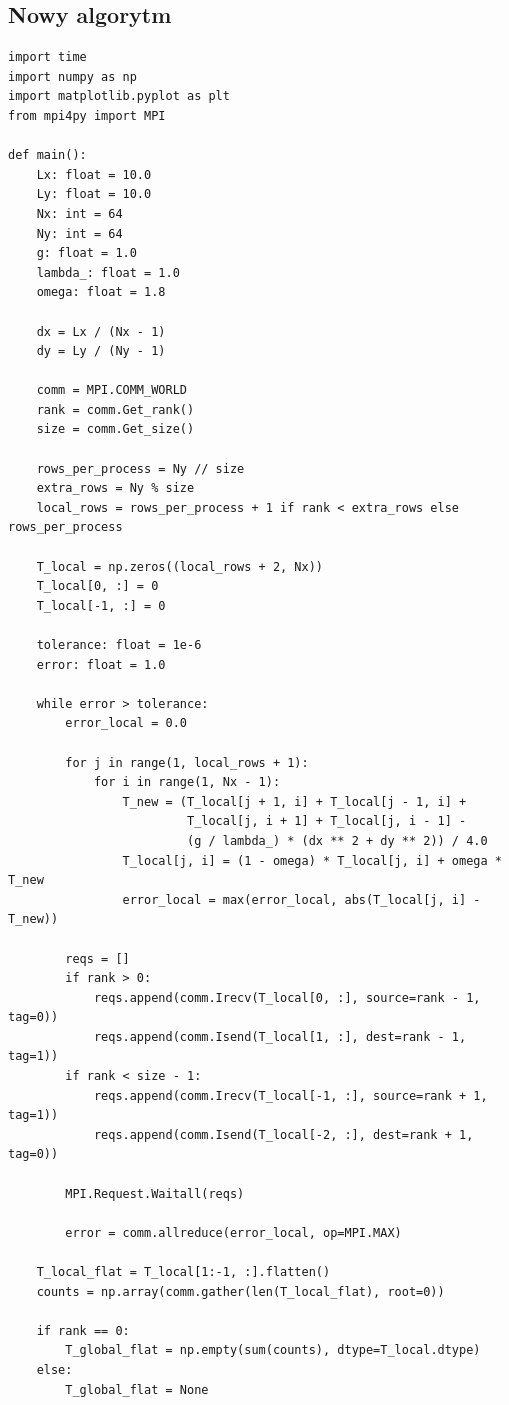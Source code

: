 \documentclass{article}
\begin{document}
\subsection{Nowy algorytm}
\begin{lstlisting}
import time
import numpy as np
import matplotlib.pyplot as plt
from mpi4py import MPI

def main():
    Lx: float = 10.0
    Ly: float = 10.0
    Nx: int = 64
    Ny: int = 64
    g: float = 1.0
    lambda_: float = 1.0
    omega: float = 1.8 

    dx = Lx / (Nx - 1)
    dy = Ly / (Ny - 1)

    comm = MPI.COMM_WORLD
    rank = comm.Get_rank()
    size = comm.Get_size()

    rows_per_process = Ny // size
    extra_rows = Ny % size
    local_rows = rows_per_process + 1 if rank < extra_rows else rows_per_process

    T_local = np.zeros((local_rows + 2, Nx)) 
    T_local[0, :] = 0 
    T_local[-1, :] = 0  

    tolerance: float = 1e-6
    error: float = 1.0

    while error > tolerance:
        error_local = 0.0

        for j in range(1, local_rows + 1):
            for i in range(1, Nx - 1):
                T_new = (T_local[j + 1, i] + T_local[j - 1, i] +
                         T_local[j, i + 1] + T_local[j, i - 1] - 
                         (g / lambda_) * (dx ** 2 + dy ** 2)) / 4.0
                T_local[j, i] = (1 - omega) * T_local[j, i] + omega * T_new
                error_local = max(error_local, abs(T_local[j, i] - T_new))

        reqs = []
        if rank > 0:
            reqs.append(comm.Irecv(T_local[0, :], source=rank - 1, tag=0))
            reqs.append(comm.Isend(T_local[1, :], dest=rank - 1, tag=1))
        if rank < size - 1:
            reqs.append(comm.Irecv(T_local[-1, :], source=rank + 1, tag=1))
            reqs.append(comm.Isend(T_local[-2, :], dest=rank + 1, tag=0))

        MPI.Request.Waitall(reqs)

        error = comm.allreduce(error_local, op=MPI.MAX)

    T_local_flat = T_local[1:-1, :].flatten() 
    counts = np.array(comm.gather(len(T_local_flat), root=0))

    if rank == 0:
        T_global_flat = np.empty(sum(counts), dtype=T_local.dtype)
    else:
        T_global_flat = None


\end{lstlisting}
\end{document}
